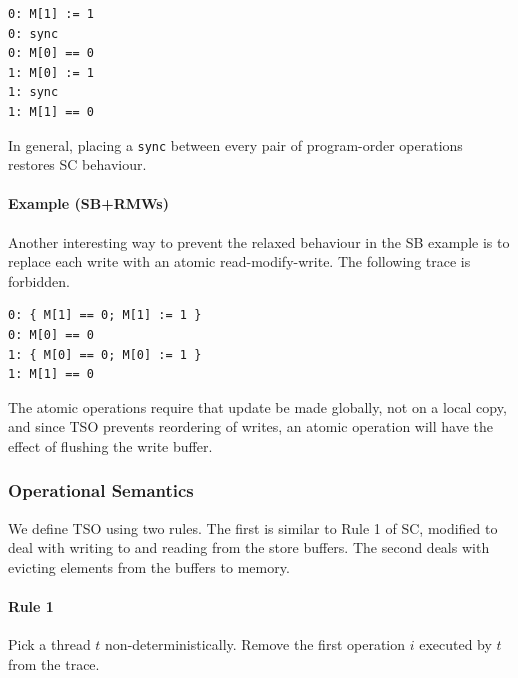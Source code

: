 \documentclass[11pt]{article}
\begin{document}
\begin{verbatim}
0: M[1] := 1
0: sync
0: M[0] == 0
1: M[0] := 1
1: sync
1: M[1] == 0
\end{verbatim}

\noindent In general, placing a \verb!sync! between every pair of program-order
operations restores SC behaviour.

\paragraph{Example (SB+RMWs)} Another interesting way to prevent the
relaxed behaviour in the SB example is to replace each write with an
atomic read-modify-write.  The following trace is forbidden.

\begin{verbatim}
0: { M[1] == 0; M[1] := 1 }
0: M[0] == 0
1: { M[0] == 0; M[0] := 1 }
1: M[1] == 0
\end{verbatim}

\noindent The atomic operations require that update be made
globally, not on a local copy, and since TSO prevents reordering of
writes, an atomic operation will have the effect of flushing the write
buffer.

\subsubsection*{Operational Semantics}

We define TSO using two rules.  The first is similar to Rule 1 of SC,
modified to deal with writing to and reading from the store buffers.
The second deals with evicting elements from the buffers to memory.

\paragraph{Rule 1}

Pick a thread $t$ non-deterministically.  Remove the first operation
$i$ executed by $t$ from the trace.
\end{document}
